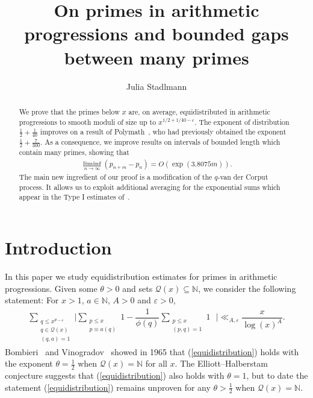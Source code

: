 \documentclass{amsart}
\numberwithin{equation}{section}
\begin{document}
\begin{abstract}
We prove that the primes below $x$ are, on average, equidistributed in arithmetic progressions to smooth moduli of size up to  $x^{1/2+1/40-\epsilon}$. The exponent of distribution $\frac{1}{2} + \frac{1}{40}$ improves on a result of Polymath~\cite{Polymath:2014:EDZ}, who had previously obtained the exponent  $\frac{1}{2} + \frac{7}{300}$. 
As a consequence, we improve results on intervals of bounded length which contain many primes, showing that 
\begin{align*}
\liminf_{n \rightarrow \infty} (p_{n+m}-p_n)  = O( \exp (3.8075 m)).
\end{align*}
The main new ingredient of our proof is a modification of the $q$-van der Corput process. It allows us to exploit additional averaging for the exponential sums which appear in the  Type I estimates of~\cite{Polymath:2014:EDZ}.
\end{abstract}


\title{On primes in arithmetic progressions and bounded gaps between many primes}
\date{}
\author{Julia Stadlmann}
\maketitle

\vspace{-5mm}

\section{Introduction}\label{sec:intro}

In this paper we study equidistribution estimates for primes in arithmetic progressions. Given some $\theta >0$ and  sets $\mathcal{Q}(x) \subseteq \mathbb{N}$, we consider the following statement: For $x>1$,  $a \in \mathbb{N}$,  $A>0$ and $\varepsilon>0$, 
\begin{align} \label{equidistribution}
\sum_{\substack{ q \leq x^{ \theta -\varepsilon } \\ q  \in \mathcal{Q}(x) \\ (q,a)=1 }} \Bigg| \sum_{\substack{ p \leq x \\ p \equiv a (q) }} 1 - \dfrac{1}{\phi(q)}\sum_{\substack{ p \leq x \\ (p,q)=1 }} 1  \,\,\,\, \Bigg| \ll_{A, \varepsilon} \dfrac{x}{\log(x)^A}.
\end{align} 
Bombieri~\cite{Bombieri:1965:OLS} and Vinogradov~\cite{Vinogradov:1965:DHD} showed in 1965 that (\ref{equidistribution}) holds with the exponent $\theta = \frac{1}{2}$ when $\mathcal{Q}(x) =\mathbb{N}$ for all $x$.  The Elliott–Halberstam conjecture suggests that (\ref{equidistribution}) also holds with $\theta = 1$,  but to date the statement (\ref{equidistribution})  remains unproven for any $\theta > \frac{1}{2}$ when $\mathcal{Q}(x) =\mathbb{N}$. 
\end{document}
